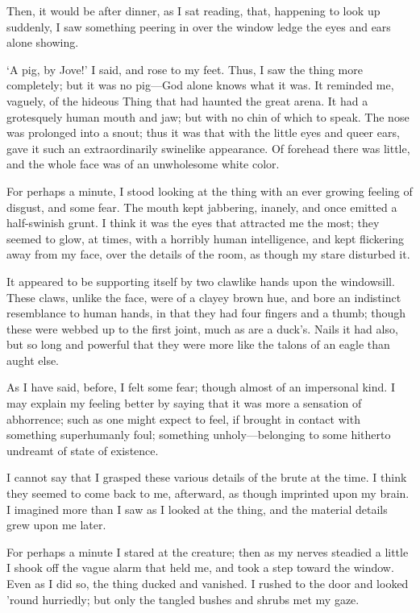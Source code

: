 Then, it would be after dinner, as I sat reading, that, happening to look up suddenly, I saw something peering in over the window ledge the eyes and ears alone showing.

‘A pig, by Jove!’ I said, and rose to my feet. Thus, I saw the thing more completely; but it was no pig---God alone knows what it was. It reminded me, vaguely, of the hideous Thing that had haunted the great arena. It had a grotesquely human mouth and jaw; but with no chin of which to speak. The nose was prolonged into a snout; thus it was that with the little eyes and queer ears, gave it such an extraordinarily swinelike appearance. Of forehead there was little, and the whole face was of an unwholesome white color.

For perhaps a minute, I stood looking at the thing with an ever growing feeling of disgust, and some fear. The mouth kept jabbering, inanely, and once emitted a half-swinish grunt. I think it was the eyes that attracted me the most; they seemed to glow, at times, with a horribly human intelligence, and kept flickering away from my face, over the details of the room, as though my stare disturbed it.

It appeared to be supporting itself by two clawlike hands upon the windowsill. These claws, unlike the face, were of a clayey brown hue, and bore an indistinct resemblance to human hands, in that they had four fingers and a thumb; though these were webbed up to the first joint, much as are a duck’s. Nails it had also, but so long and powerful that they were more like the talons of an eagle than aught else.

As I have said, before, I felt some fear; though almost of an impersonal kind. I may explain my feeling better by saying that it was more a sensation of abhorrence; such as one might expect to feel, if brought in contact with something superhumanly foul; something unholy---belonging to some hitherto undreamt of state of existence.

I cannot say that I grasped these various details of the brute at the time. I think they seemed to come back to me, afterward, as though imprinted upon my brain. I imagined more than I saw as I looked at the thing, and the material details grew upon me later.

For perhaps a minute I stared at the creature; then as my nerves steadied a little I shook off the vague alarm that held me, and took a step toward the window. Even as I did so, the thing ducked and vanished. I rushed to the door and looked ’round hurriedly; but only the tangled bushes and shrubs met my gaze.

